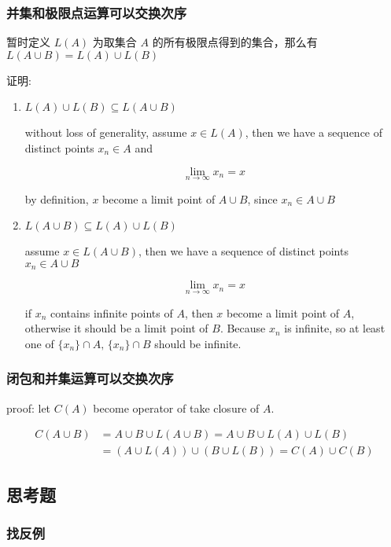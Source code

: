 \documentclass[12pt,a4paper]{ctexart}
\begin{document}
\subsubsection{并集和极限点运算可以交换次序}

暂时定义 $L(A)$ 为取集合 $A$ 的所有极限点得到的集合，那么有 $L(A \cup B) = L(A) \cup L(B)$

证明:

\begin{enumerate}
    \item $L(A) \cup L(B) \subseteq L(A \cup B)$

    without loss of generality, assume $x \in L(A)$, then we have a sequence of distinct points $x_n \in A$ and

    \[
        \lim_{n \to \infty}x_n =x
    \]

    by definition, $x$ become a limit point of $A \cup B$, since $x_n \in A \cup B$

    \item $L(A \cup B) \subseteq L(A) \cup L(B)$

    assume $x \in L(A \cup B)$, then we have a sequence of distinct points $x_n \in A \cup B$

    \[
        \lim_{n \to \infty}x_n =x
    \]

    if $x_n$ contains infinite points of $A$, then $x$ become a limit point of $A$, otherwise it should 
    be a limit point of $B$. Because $x_n$ is infinite, so at least one of $\{ x_n \} \cap A,\, \{ x_n \} \cap B$ 
    should be infinite.
\end{enumerate}

\subsubsection{闭包和并集运算可以交换次序}

proof: let $C(A)$ become operator of take closure of $A$.

\begin{align}
    C(A \cup B) &=  A \cup B \cup L(A \cup B)  = A \cup B \cup L(A)  \cup L(B) \\
    &=  (A \cup L(A)) \cup (B \cup L(B)) = C(A) \cup C(B)
\end{align}

\subsection{思考题}

\subsubsection{找反例}
\end{document}
